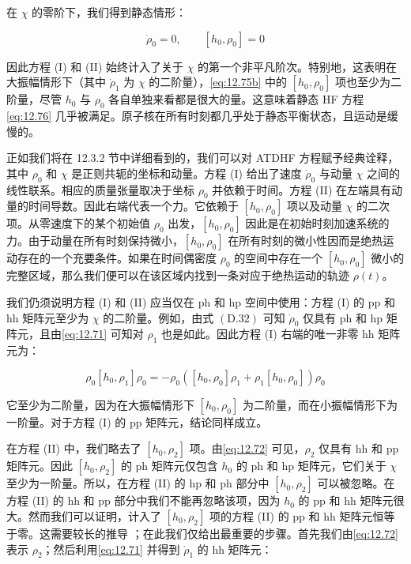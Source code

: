 在 $\chi$ 的零阶下，我们得到静态情形：

\begin{equation}
\dot{\rho}_{0}=0,\qquad[h_{0},\rho_{0}]=0\label{eq:12.76}
\end{equation}

因此方程 (I) 和 (II) 始终计入了关于 $\chi$ 的第一个非平凡阶次。特别地，这表明在大振幅情形下（其中 $\dot{\rho}_{1}$
为 $\chi$ 的二阶量），\ref{eq:12.75b} 中的 $[h_{0},\rho_{0}]$ 项也至少为二阶量，尽管
$h_{0}$ 与 $\rho_{0}$ 各自单独来看都是很大的量。这意味着静态 HF 方程 \ref{eq:12.76} 几乎被满足。原子核在所有时刻都几乎处于静态平衡状态，且运动是缓慢的。

正如我们将在 12.3.2 节中详细看到的，我们可以对 ATDHF 方程赋予经典诠释，其中 $\rho_{0}$ 和 $\chi$
是正则共轭的坐标和动量。方程 (I) 给出了速度 $\dot{\rho}_{0}$ 与动量 $\chi$ 之间的线性联系。相应的质量张量取决于坐标
$\rho_{0}$ 并依赖于时间。方程 (II) 在左端具有动量的时间导数。因此右端代表一个力。它依赖于 $[h_{0},\rho_{0}]$
项以及动量 $\chi$ 的二次项。从零速度下的某个初始值 $\rho_{0}$ 出发，$[h_{0},\rho_{0}]$
因此是在初始时刻加速系统的力。由于动量在所有时刻保持微小，$[h_{0},\rho_{0}]$ 在所有时刻的微小性因而是绝热运动存在的一个充要条件。如果在时间偶密度
$\rho_{0}$ 的空间中存在一个 $[h_{0},\rho_{0}]$ 微小的完整区域，那么我们便可以在该区域内找到一条对应于绝热运动的轨迹
$\rho(t)$。

我们仍须说明方程 (I) 和 (II) 应当仅在 ph 和 hp 空间中使用：方程 (I) 的 pp 和 hh 矩阵元至少为 $\chi$
的二阶量。例如，由式 $(\text{D}.32)$ 可知 $\dot{\rho}_{0}$ 仅具有 ph 和 hp 矩阵元，且由\ref{eq:12.71}
可知对 $\rho_{1}$ 也是如此。因此方程 (I) 右端的唯一非零 hh 矩阵元为：

\begin{equation}
\rho_{0}[h_{0},\rho_{1}]\rho_{0}=-\rho_{0}\left([h_{0},\rho_{0}]\rho_{1}+\rho_{1}[h_{0},\rho_{0}]\right)\rho_{0}\label{eq:12.77}
\end{equation}

它至少为二阶量，因为在大振幅情形下 $[h_{0},\rho_{0}]$ 为二阶量，而在小振幅情形下为一阶量。对于方程 (I) 的
pp 矩阵元，结论同样成立。

在方程 (II) 中，我们略去了 $[h_{0},\rho_{2}]$ 项。由\ref{eq:12.72} 可见，$\rho_{2}$
仅具有 hh 和 pp 矩阵元。因此 $[h_{0},\rho_{2}]$ 的 ph 矩阵元仅包含 $h_{0}$ 的 ph 和
hp 矩阵元，它们关于 $\chi$ 至少为一阶量。所以，在方程 (II) 的 hp 和 ph 部分中 $[h_{0},\rho_{2}]$
可以被忽略。在方程 (II) 的 hh 和 pp 部分中我们不能再忽略该项，因为 $h_{0}$ 的 pp 和 hh 矩阵元很大。然而我们可以证明，计入了
$[h_{0},\rho_{2}]$ 项的方程 (II) 的 pp 和 hh 矩阵元恒等于零。这需要较长的推导 \cite{BV78}；在此我们仅给出最重要的步骤。首先我们由\ref{eq:12.72}
表示 $\rho_{2}$；然后利用\ref{eq:12.71} 并得到 $\dot{\rho}_{1}$ 的 hh 矩阵元：

